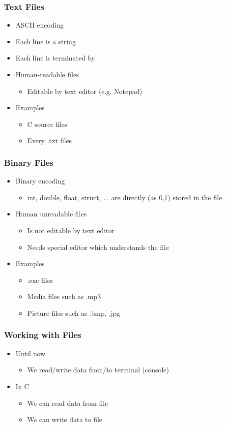 \documentclass{../c-lecture}
\begin{document}
\begin{frame}
  \frametitle{Text Files}
  \begin{itemize}
    \item ASCII encoding
    \item Each line is a string
    \item Each line is terminated by \n
    \item Human-readable files
    \begin{itemize}
      \item Editable by text editor (e.g. Notepad)
    \end{itemize}
    \item Examples
    \begin{itemize}
      \item C source files
      \item Every .txt files
    \end{itemize}
  \end{itemize}
\end{frame}
\begin{frame}
  \frametitle{Binary Files}
  \begin{itemize}
    \item Binary encoding
    \begin{itemize}
      \item
        int, double, float, struct, ... are directly (as 0,1) stored in the file

    \end{itemize}
    \item Human unreadable files
    \begin{itemize}
      \item Is not editable by text editor
      \item Needs special editor which understands the file
    \end{itemize}
    \item Examples
    \begin{itemize}
      \item .exe files
      \item Media files such as .mp3
      \item Picture files such as .bmp, .jpg
    \end{itemize}
  \end{itemize}
\end{frame}
\begin{frame}
  \frametitle{Working with Files}
  \begin{itemize}
    \item Until now
    \begin{itemize}
      \item We read/write data from/to terminal (console)
    \end{itemize}
    \item In C
    \begin{itemize}
      \item We can read data from file
      \item We can write data to file
    \end{itemize}
  \end{itemize}
\end{frame}
\end{document}
